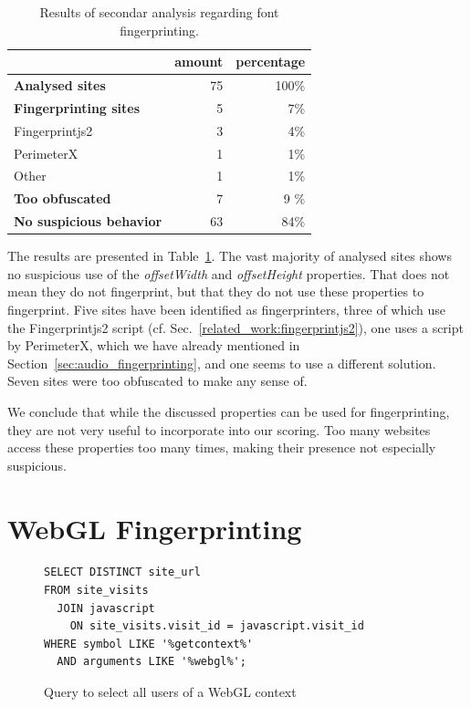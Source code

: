 \documentclass[
    fontsize=12pt,
    headings=small,
    parskip=half,
    bibliography=totoc,
    numbers=noenddot,
    open=any
    ]{scrreprt}
\begin{document}
\begin{table}
\centering
\caption{Results of secondar analysis regarding font fingerprinting.}
\begin{tabular}{l r r}
    \toprule
    & amount & percentage \\
    \midrule
    \textbf{Analysed sites} & 75 & 100\% \\
    \midrule
    \textbf{Fingerprinting sites} & 5 & 7\% \\
    Fingerprintjs2 & 3 & 4\% \\
    PerimeterX & 1 & 1\% \\
    Other & 1 & 1\% \\
    \midrule
    \textbf{Too obfuscated} & 7 & 9 \% \\
    \midrule
    \textbf{No suspicious behavior} & 63 & 84\% \\
    \bottomrule
\end{tabular}
\label{table:offsetwidth_results}
\end{table}


The results are presented in Table~\ref{table:offsetwidth_results}. The vast majority of analysed sites
shows no suspicious use of the \textit{offsetWidth} and \textit{offsetHeight} properties.
That does not mean they do not fingerprint, but that they do not use these properties to fingerprint.
Five sites have been identified as fingerprinters, three of which use the Fingerprintjs2 script
(cf. Sec.~\ref{related_work:fingerprintjs2}), one uses a script by PerimeterX, which we have
already mentioned in Section~\ref{sec:audio_fingerprinting}, and one seems to use
a different solution.
Seven sites were too obfuscated to make any sense of.

We conclude that while the discussed properties can be used for fingerprinting,
they are not very useful to incorporate into our scoring. Too many websites access these properties
too many times, making their presence not especially suspicious.


\section{WebGL Fingerprinting}

\begin{figure}
\begin{verbatim}
SELECT DISTINCT site_url
FROM site_visits
  JOIN javascript
    ON site_visits.visit_id = javascript.visit_id
WHERE symbol LIKE '%getcontext%'
  AND arguments LIKE '%webgl%';
\end{verbatim}
\caption{Query to select all users of a WebGL context}
\label{code:webgl_query}
\end{figure}
\end{document}
